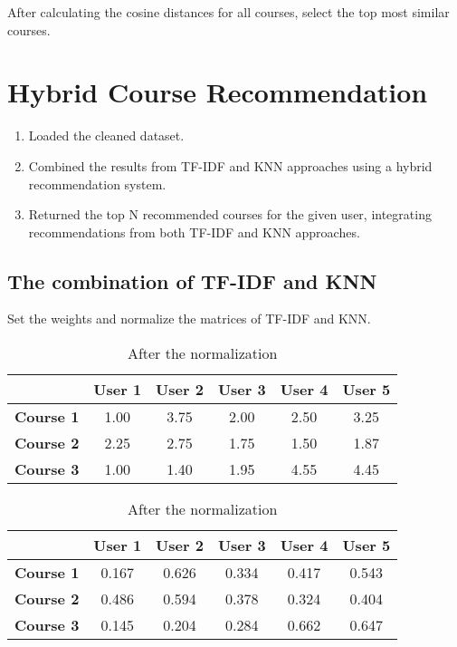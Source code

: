 \noindent After calculating the cosine distances for all courses, select the top most similar courses.

\section{Hybrid Course Recommendation}
\begin{enumerate}
    \item \textsf{Loaded the cleaned dataset.}
    \item \textsf{Combined the results from TF-IDF and KNN approaches using 
    a hybrid recommendation system.}
    \item \textsf{Returned the top N recommended courses for the given user, 
    integrating recommendations from both TF-IDF and KNN approaches.}
\end{enumerate}

\vspace{25pt}
\subsection{The combination of TF-IDF and KNN}

Set the weights and normalize the matrices of TF-IDF and KNN.
\begin{table}[H]
    \centering
    \vspace{10pt}
    \begin{tabular}{|c|c|c|c|c|c|}
        \hline
        & \textbf{User 1} & \textbf{User 2} & \textbf{User 3} & \textbf{User 4} & \textbf{User 5} \\
        \hline
        \textbf{Course 1} & 1.00 & 3.75 & 2.00 & 2.50 & 3.25 \\
        \hline
        \textbf{Course 2} & 2.25 & 2.75 & 1.75 & 1.50 & 1.87 \\
        \hline
        \textbf{Course 3} & 1.00 & 1.40 & 1.95 & 4.55 & 4.45 \\
        \hline
    \end{tabular}
    \caption{Before the normalization}
    \vspace{10pt}
    \begin{tabular}{|c|c|c|c|c|c|}
        \hline
        & \textbf{User 1} & \textbf{User 2} & \textbf{User 3} & \textbf{User 4} & \textbf{User 5} \\
        \hline
        \textbf{Course 1} & 0.167 & 0.626 & 0.334 & 0.417 & 0.543 \\
        \hline
        \textbf{Course 2} & 0.486 & 0.594 & 0.378 & 0.324 & 0.404 \\
        \hline
        \textbf{Course 3} & 0.145 & 0.204 & 0.284 & 0.662 & 0.647 \\
        \hline
    \end{tabular}
    \caption{After the normalization}
\end{table}

